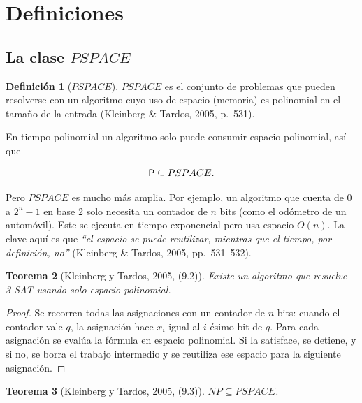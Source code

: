 \documentclass[11pt,letterpaper]{article}
\theoremstyle{plain}
\newtheorem{teorema}{Teorema}[section]
\theoremstyle{definition}
\newtheorem{definicion}[teorema]{Definición}
\theoremstyle{remark}
\newcommand{\nombreMat}[1]{\ensuremath{\text{\fontencoding{OT1}\fontfamily{cmss}\upshape\selectfont #1}}}
\newcommand{\PSPACE}{\nombreMat{PSPACE}}
\newcommand{\NP}{\nombreMat{NP}}
\newcommand{\Pclass}{\nombreMat{P}}
\newcommand{\coNP}{\nombreMat{co-NP}}
\def\PSPACE{PSPACE}\def\NP{NP}\def\coNP{co-NP}%
\begin{document}

\newpage
\section{Definiciones}

\subsection{La clase $\PSPACE$}

\begin{definicion}[$\PSPACE$]
$\PSPACE$ es el conjunto de problemas que pueden resolverse con
un algoritmo cuyo uso de espacio (memoria) es polinomial en el
tamaño de la entrada
(Kleinberg \& Tardos, 2005, p.~531).
\end{definicion}

En tiempo polinomial un algoritmo solo puede consumir espacio
polinomial, así que

\begin{equation}\label{eq:PsubPSPACE}
\Pclass \subseteq \PSPACE.
\end{equation}

Pero $\PSPACE$ es mucho más amplia. Por ejemplo, un algoritmo
que cuenta de $0$ a $2^{n}-1$ en base $2$ solo necesita un
contador de $n$ bits (como el odómetro de un automóvil).
Este se ejecuta en tiempo exponencial pero usa espacio $O(n)$.
La clave aquí es que \emph{``el espacio se puede reutilizar,
mientras que el tiempo, por definición, no''}
(Kleinberg \& Tardos, 2005, pp.~531--532).

\begin{teorema}[Kleinberg y Tardos, 2005, (9.2)]
\label{teo:3SATpspace}
Existe un algoritmo que resuelve 3-SAT usando solo espacio
polinomial.
\end{teorema}

\begin{proof}
Se recorren todas las asignaciones con un contador de $n$ bits:
cuando el contador vale $q$, la asignación hace $x_i$ igual al
$i$-ésimo bit de $q$. Para cada asignación se evalúa la fórmula
en espacio polinomial. Si la satisface, se detiene, y si no,
se borra el trabajo intermedio y se reutiliza ese espacio
para la siguiente asignación.
\end{proof}

\begin{teorema}[Kleinberg y Tardos, 2005, (9.3)]
\label{teo:NPsubPSPACE}
$\NP \subseteq \PSPACE$.
\end{teorema}
\end{document}
